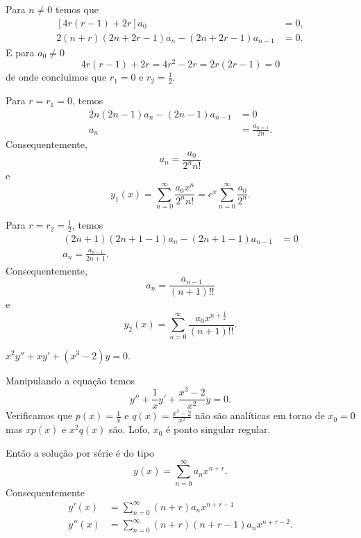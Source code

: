 \documentclass[a4paper,12pt, leqno, answers]{exam}
\begin{document}
\begin{questions}
\begin{solution}
        Para $n \neq 0$ temos que
        \begin{align*}
            \left[ 4 r \left( r - 1 \right) + 2 r \right] a_0 &= 0, \\
            2 \left( n + r \right) \left( 2n + 2 r - 1 \right) a_n - \left( 2 n + 2 r - 1 \right) a_{n - 1} &= 0.
        \end{align*}
        E para $a_0 \neq 0$
        \[
        4 r \left( r - 1 \right) + 2 r = 4r^2 - 2r = 2r \left( 2 r - 1 \right) = 0
        \]
        de onde concluimos que $r_1 = 0$ e $r_2 = \frac{1}{2}$.

        Para $r = r_1 = 0$, temos
        \begin{align*}
            2 n \left(2 n - 1 \right) a_n - \left( 2 n - 1 \right) a_{n - 1} &= 0 \\
            a_n &= \frac{a_{n = 1}}{2 n}.
        \end{align*}
        Consequentemente,
        \[
        a_n = \frac{a_0}{2^n n!}
        \]
        e
        \[
        y_1(x) = \sum_{n = 0}^\infty \frac{a_0 x^n}{2^n n!} = e^x \sum_{n = 0}^\infty \frac{a_0}{2^n}.
        \]

        Para $r = r_2 = \frac{1}{2}$, temos
        \begin{align*}
            \left( 2 n + 1 \right) \left( 2 n + 1 - 1 \right) a_n - \left( 2 n + 1 - 1 \right) a_{n - 1} &= 0 \\
            a_n = \frac{a_{n - 1}}{2 n + 1}.
        \end{align*}
        Consequentemente,
        \[
        a_n = \frac{a_{n - 1}}{\left( n + 1 \right)!!}
        \]
        e
        \[
        y_2(x) = \sum_{n = 0}^\infty \frac{a_0 x^{n + \frac{1}{2}}}{\left( n + 1 \right)!!}.
        \]
    \end{solution}

    \question $x^2 y'' + x y' + \left( x^3 - 2 \right) y = 0$.
    \begin{solution}
        Manipulando a equa\c{c}\~{a}o temos
        \[
        y'' + \frac{1}{x} y' + \frac{x^3 - 2}{x^2} y = 0.
        \]
        Verificamos que $p(x) = \frac{1}{x}$ e $q(x) = \frac{x^3 - 2}{x^2}$ n\~{a}o s\~{a}o anal\'{i}ticas em torno de $x_0 = 0$ mas $x p(x)$ e $x^2 q(x)$ s\~{a}o. Lofo, $x_0$ \'{e} ponto singular regular.

        Ent\~{a}o a solu\c{c}\~{a}o por s\'{e}rie \'{e} do tipo
        \[
        y\left( x \right) = \sum_{n = 0}^\infty a_n x^{n + r}.
        \]
        Consequentemente
        \begin{align*}
            y'(x) &= \sum_{n = 0}^\infty \left( n + r \right) a_n x^{n + r - 1} \\
            y''(x) &= \sum_{n = 0}^\infty \left( n + r \right) \left( n + r - 1 \right) a_n x^{n + r - 2}.
        \end{align*}


\end{solution}
\end{questions}
\end{document}
